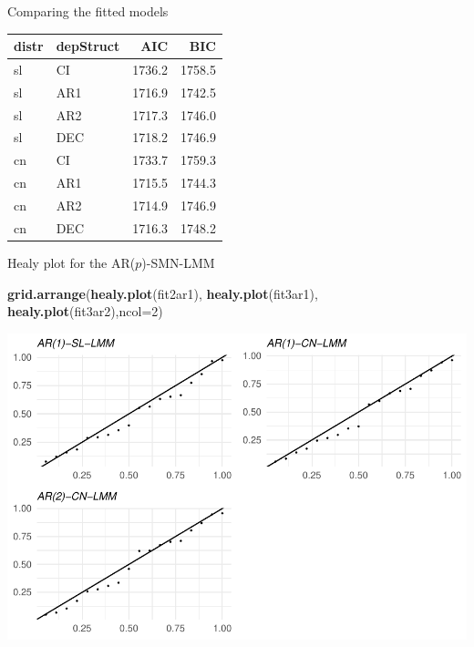 \documentclass[
  ignorenonframetext,
]{beamer}
\newenvironment{Shaded}{\begin{snugshade}}{\end{snugshade}}
\newcommand{\DataTypeTok}[1]{\textcolor[rgb]{0.13,0.29,0.53}{#1}}
\newcommand{\DecValTok}[1]{\textcolor[rgb]{0.00,0.00,0.81}{#1}}
\newcommand{\KeywordTok}[1]{\textcolor[rgb]{0.13,0.29,0.53}{\textbf{#1}}}
\newcommand{\NormalTok}[1]{#1}
\begin{document}
\begin{frame}{Comparing the fitted models}
\protect\hypertarget{comparing-the-fitted-models-1}{}

\begin{longtable}[]{@{}llrr@{}}
\toprule
distr & depStruct & AIC & BIC\tabularnewline
\midrule
\endhead
sl & CI & 1736.2 & 1758.5\tabularnewline
sl & AR1 & 1716.9 & 1742.5\tabularnewline
sl & AR2 & 1717.3 & 1746.0\tabularnewline
sl & DEC & 1718.2 & 1746.9\tabularnewline
cn & CI & 1733.7 & 1759.3\tabularnewline
cn & AR1 & 1715.5 & 1744.3\tabularnewline
cn & AR2 & 1714.9 & 1746.9\tabularnewline
cn & DEC & 1716.3 & 1748.2\tabularnewline
\bottomrule
\end{longtable}

\end{frame}

\begin{frame}[fragile]{Healy plot for the AR(\(p\))-SMN-LMM}
\protect\hypertarget{healy-plot-for-the-arp-smn-lmm}{}

\small

\begin{Shaded}
\begin{Highlighting}[]
\KeywordTok{grid.arrange}\NormalTok{(}\KeywordTok{healy.plot}\NormalTok{(fit2ar1),}
            \KeywordTok{healy.plot}\NormalTok{(fit3ar1),}
            \KeywordTok{healy.plot}\NormalTok{(fit3ar2),}\DataTypeTok{ncol=}\DecValTok{2}\NormalTok{)}
\end{Highlighting}
\end{Shaded}

\begin{center}\includegraphics[width=0.85\linewidth]{codes_files/figure-beamer/healy2-1} \end{center}

\end{frame}
\end{document}
